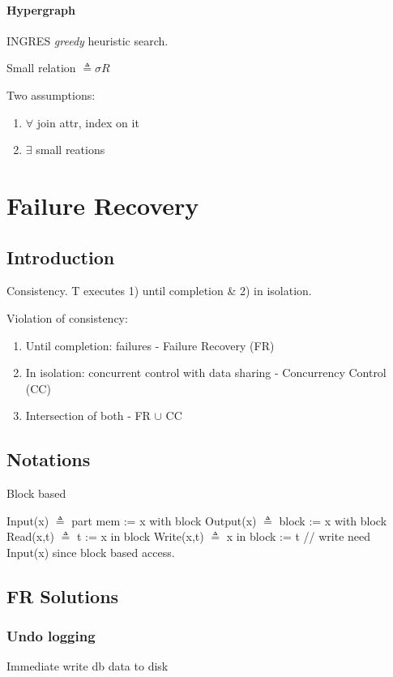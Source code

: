 \documentclass[a4paper]{report}
\begin{document}
\subsubsection{Hypergraph}
INGRES \textit{greedy} heuristic search. 

Small relation $\triangleq \sigma R$  

Two assumptions:
\begin{enumerate}
\item $\forall$ join attr, index on it
\item $\exists$  small reations
\end{enumerate}

\chapter{Failure Recovery}
\section*{Introduction}
Consistency. T executes 1) until completion \& 2) in isolation. 

Violation of consistency: 
\begin{enumerate}
\item Until completion: failures - Failure Recovery (FR)
\item In isolation: concurrent control with data sharing - Concurrency Control
(CC)
\item Intersection of both - FR $\cup$ CC
\end{enumerate}

\section{Notations}
Block based 
\begin{enumerate}
\treeitem Input(x) $\triangleq$ part mem := x with block 
\treeitem Output(x) $\triangleq$ block := x with block
\treeitem Read(x,t) $\triangleq$ t := x in block 
\treeitem Write(x,t) $\triangleq$ x in block := t // write need Input(x) since block based access.
\end{enumerate}

\section{FR Solutions}
\subsection{Undo logging}
Immediate write db data to disk 
\end{document}

